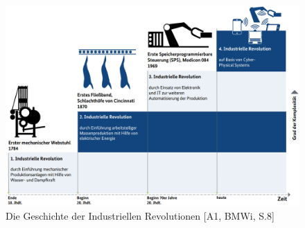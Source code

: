 \begin{figure}[h]
	\centering
	\includegraphics[width=1\linewidth]{Bilder/A1_DieGeschichteDerIndustriellenRevolutionenBMWI}
	\caption{Die Geschichte der Industriellen Revolutionen [A1, BMWi, S.8]}
	\label{fig:IndustrielleRevolutionenBild}
\end{figure}

